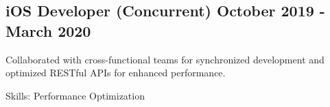 \subsection{{iOS Developer (Concurrent) \hfill October 2019 - March 2020}}
\begin{zitemize}


\item Collaborated with cross-functional teams for synchronized development and optimized RESTful APIs for enhanced performance.

\item[] Skills: Performance Optimization
    
\end{zitemize}
